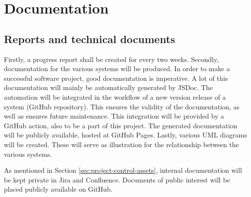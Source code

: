 \chapter{Documentation}
\section{Reports and technical documents}
Firstly, a progress report shall be created for every two weeks. Secondly, documentation for the various systems will be produced. In order to make a successful software project, good documentation is imperative. A lot of this documentation will mainly be automatically generated by JSDoc. The automation will be integrated in the workflow of a new version release of a system (GitHub repository). This ensures the validity of the documentation, as well as ensures future maintenance. This integration will be provided by a GitHub action, also to be a part of this project. The generated documentation will be publicly available, hosted at GitHub Pages. Lastly, various UML diagrams will be created. These will serve as illustration for the relationship between the various systems.

As mentioned in Section \ref{sec:project-control-assets}, internal documentation will be kept private in Jira and Confluence. Documents of public interest will be placed publicly available on GitHub.